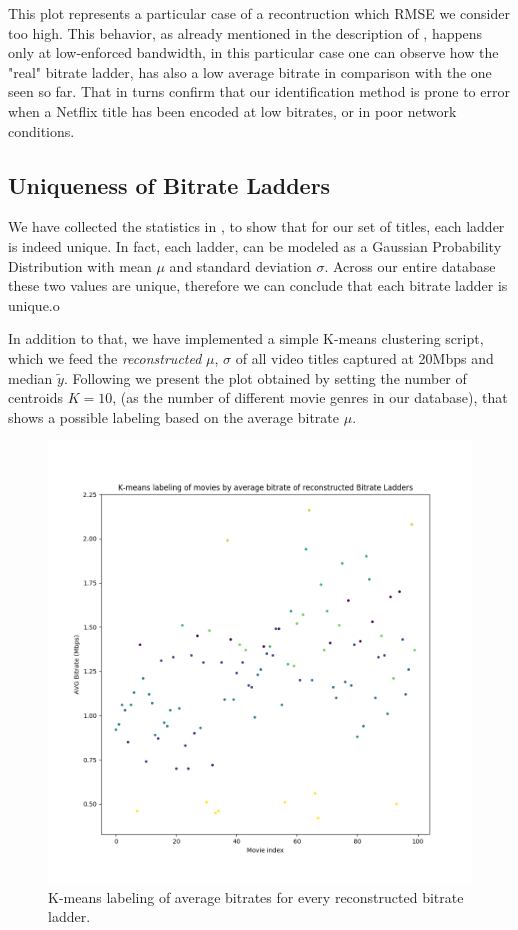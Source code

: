 This plot represents a particular case of a recontruction which RMSE we
consider too high. This behavior, as already mentioned in the description of
, happens only at low-enforced bandwidth, in this
particular case one can observe how the "real" bitrate ladder, has also a low
average bitrate in comparison with the one seen so far. That in turns confirm
that our identification method is prone to error when a Netflix title has been
encoded at low bitrates, or in poor network conditions.

\subsection{Uniqueness of Bitrate Ladders}

We have collected the statistics in , to show
that for our set of titles, each ladder is indeed unique. In fact, each ladder,
can be modeled as a Gaussian Probability Distribution with mean $\mu$ and
standard deviation $\sigma$. Across our entire database these two values are
unique, therefore we can conclude that each bitrate ladder is unique.o

In addition to that, we have implemented a simple K-means clustering script,
which we feed the \emph{reconstructed} $\mu$, $\sigma$ of all video titles
captured at 20Mbps and median $\tilde{y}$.  Following we present the plot
obtained by setting the number of centroids $K = 10$, (as the number of
different movie genres in our database), that shows a possible labeling based on
the average bitrate $\mu$.

\begin{figure}[!h]
  \centering
  \includegraphics[width=\columnwidth]{img/clusters.png}
  \caption{K-means labeling of average bitrates for every reconstructed bitrate
  ladder.}
  \label{fig:clusters}
\end{figure}

